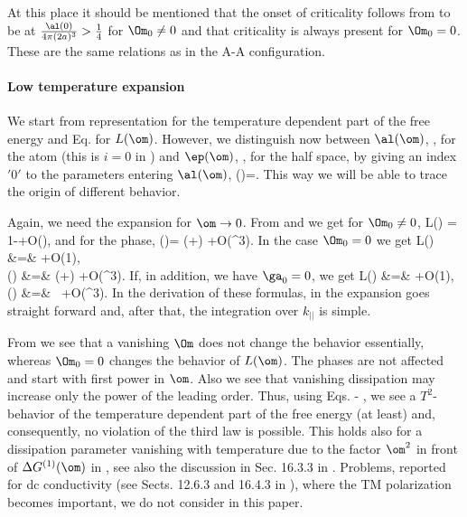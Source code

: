\documentclass[notitlepage,prd,aps,longbibliography,twocolumn]{revtex4-1}
\begin{document}
At this place it should be mentioned that the onset of criticality follows from  to be at $\frac{\al(0)}{4\pi (2a)^3}>\frac14$ for $\Om_0\ne0$ and that criticality is always present for $\Om_0=0$. These are the same relations as in the A-A configuration.

%
\paragraph{Low temperature expansion}
We start from representation  for the temperature dependent part of the free energy and Eq.  for $L(\om)$. However, we distinguish now between $\al(\om)$, , for the atom (this is $i=0$ in ) and $\ep(\om)$, , for the half space, by giving an index $'0'$ to the parameters entering $\al(\om)$,
%
\be \al(\om)=.
\label{4.32a}\ee
%
This way we will be able to trace the origin of different behavior.

Again, we need the expansion for $\om\to 0$. From  and  we get for $\Om_0\ne0$,
%
\be L(\om) = 1-+O(\om),
\label{4.33}\ee
%
and for the phase,
%
\be \delta(\om)=%
\left(+\right)  \om+O(\om^3).
\label{4.34}\ee
%
In the case $\Om_0=0$ we get
%
\bea L(\om) &=& +O(1),
\nn\\
 \delta(\om) &=&%
\left(+\right)  \om+O(\om^3).
\label{4.35}\eea
%
If, in addition, we have $\ga_0=0$, we get
%
\bea L(\om) &=& +O(1),
\nn\\
 \delta(\om) &=&%
   \, \om+O(\om^3).
\label{4.35a}\eea
%
In the derivation of these formulas, in  the expansion goes straight forward and, after that, the integration over $k_{||}$ is simple.

From  we see that a vanishing $\Om$ does not change the behavior essentially, whereas $\Om_0=0$ changes the behavior of $L(\om)$. The phases are not affected and start with first power in $\om$. Also we see that vanishing dissipation may increase only the power of the leading order.  Thus, using Eqs.  - , we see a $ T^2$-behavior of the temperature dependent part of the free energy (at least) and, consequently, no violation of the third law is possible.
This holds also for a dissipation parameter vanishing with temperature due to the factor $\om^2$ in front of $\Delta G^{(1)}(\om)$ in , see also the discussion in Sec. 16.3.3 in \cite{BKMM}. Problems, reported for dc conductivity (see Sects. 12.6.3 and 16.4.3 in \cite{BKMM}), where the TM polarization becomes important, we do not consider in this paper.
%
\end{document}
